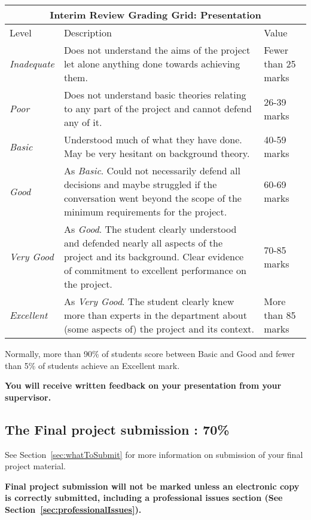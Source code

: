 \documentclass[11pt]{article}
\newcommand{\finalweight}{70\% }
\newcommand{\interimreportweight}{10\% }
\begin{document}
\noindent
\begin{tabular}{||l|p{10cm}|l||}
\hline
\hline
\multicolumn{3}{||c||}{\textbf{Interim Review Grading Grid: Presentation}}\\
\hline
\hline
Level & Description & Value\\
\hline
\textit{Inadequate} & Does not understand the aims of the project let alone anything done towards achieving them.
 & Fewer than 25 marks\\ \hline
\textit{Poor} & Does not understand basic theories relating to any part of the project and cannot defend any of it.
 & 26-39 marks\\ \hline
\textit{Basic} & Understood much of what they have done. May be very hesitant on
background theory.
 & 40-59 marks\\ \hline
\textit{Good} & As \textit{Basic}. Could not necessarily defend all
decisions and maybe struggled if the conversation went beyond the scope of the minimum requirements for the project.& 60-69 marks\\ \hline
\textit{Very Good} & As \textit{Good}.  The student clearly understood and defended nearly all aspects of the project and its background.  Clear evidence of commitment to excellent performance on the project.
 & 70-85 marks\\ \hline
\textit{Excellent} & As \textit{Very Good}.  The student clearly knew more than experts in the department about (some aspects of) the project
and its context.
 & More than 85 marks\\
\hline\hline
\end{tabular}

Normally, more than 90\% of students score between Basic and Good and fewer than 5\% of students achieve an Excellent mark.

\textbf{You will receive written feedback on your presentation from your supervisor.}


\newpage
\subsection{The Final project submission : \finalweight}
\label{sec:assess-final}
See Section~\ref{sec:whatToSubmit} for more information on submission of your final project material.

\textbf{Final project submission will not be marked unless an electronic copy is correctly submitted, including a professional issues section (See Section~\ref{sec:professionalIssues}).}
\end{document}
